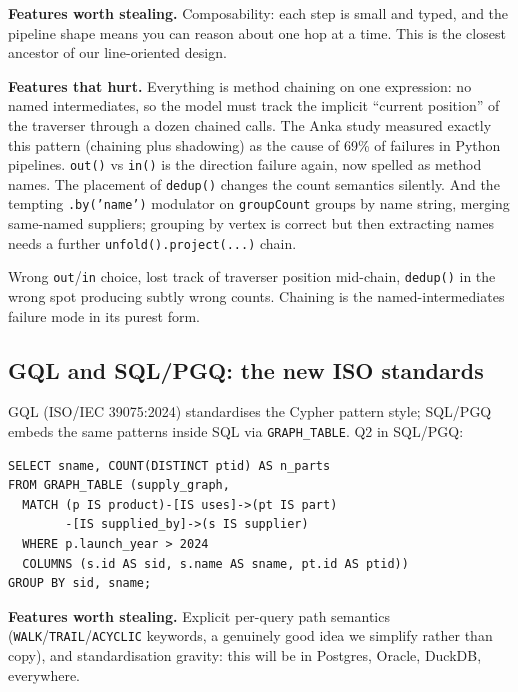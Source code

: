 \documentclass[11pt]{article}
\begin{document}
\textbf{Features worth stealing.} Composability: each step is small and typed, and the pipeline shape means you can reason about one hop at a time. This is the closest ancestor of our line-oriented design.

\textbf{Features that hurt.} Everything is method chaining on one expression: no named intermediates, so the model must track the implicit ``current position'' of the traverser through a dozen chained calls. The Anka study measured exactly this pattern (chaining plus shadowing) as the cause of 69\% of failures in Python pipelines. \texttt{out()} vs \texttt{in()} is the direction failure again, now spelled as method names. The placement of \texttt{dedup()} changes the count semantics silently. And the tempting \texttt{.by('name')} modulator on \texttt{groupCount} groups by name string, merging same-named suppliers; grouping by vertex is correct but then extracting names needs a further \texttt{unfold().project(...)} chain.

\begin{failbox}
Wrong \texttt{out}/\texttt{in} choice, lost track of traverser position mid-chain, \texttt{dedup()} in the wrong spot producing subtly wrong counts. Chaining is the named-intermediates failure mode in its purest form.
\end{failbox}

\subsection{GQL and SQL/PGQ: the new ISO standards}

GQL (ISO/IEC 39075:2024) standardises the Cypher pattern style; SQL/PGQ embeds the same patterns inside SQL via \texttt{GRAPH\_TABLE}. Q2 in SQL/PGQ:

\begin{lstlisting}[style=old,morekeywords={SELECT,FROM,GRAPH_TABLE,MATCH,WHERE,COLUMNS,GROUP,BY,COUNT,DISTINCT,AS}]
SELECT sname, COUNT(DISTINCT ptid) AS n_parts
FROM GRAPH_TABLE (supply_graph,
  MATCH (p IS product)-[IS uses]->(pt IS part)
        -[IS supplied_by]->(s IS supplier)
  WHERE p.launch_year > 2024
  COLUMNS (s.id AS sid, s.name AS sname, pt.id AS ptid))
GROUP BY sid, sname;
\end{lstlisting}

\textbf{Features worth stealing.} Explicit per-query path semantics (\texttt{WALK}/\texttt{TRAIL}/\texttt{ACYCLIC} keywords, a genuinely good idea we simplify rather than copy), and standardisation gravity: this will be in Postgres, Oracle, DuckDB, everywhere.
\end{document}
